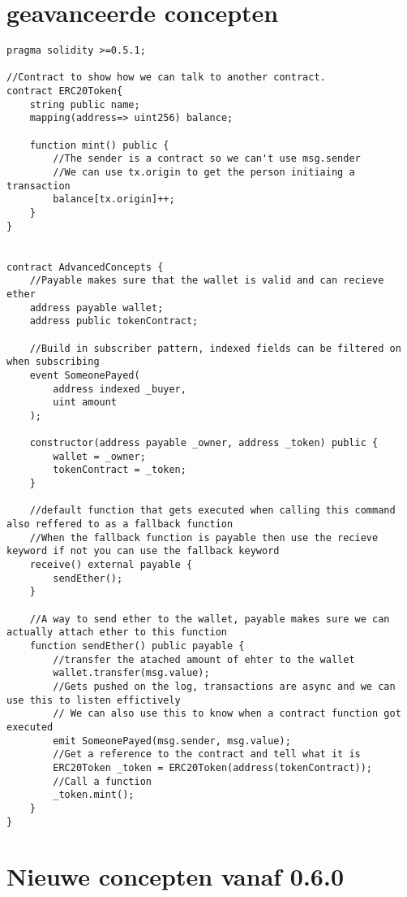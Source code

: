 \section{geavanceerde concepten}
\begin{lstlisting}[language=Solidity]
pragma solidity >=0.5.1;

//Contract to show how we can talk to another contract.
contract ERC20Token{
    string public name;
    mapping(address=> uint256) balance;

    function mint() public {
        //The sender is a contract so we can't use msg.sender
        //We can use tx.origin to get the person initiaing a transaction
        balance[tx.origin]++;
    }
}


contract AdvancedConcepts {
    //Payable makes sure that the wallet is valid and can recieve ether
    address payable wallet;
    address public tokenContract;

    //Build in subscriber pattern, indexed fields can be filtered on when subscribing
    event SomeonePayed(
        address indexed _buyer,
        uint amount
    );

    constructor(address payable _owner, address _token) public {
        wallet = _owner;
        tokenContract = _token;
    }

    //default function that gets executed when calling this command also reffered to as a fallback function
    //When the fallback function is payable then use the recieve keyword if not you can use the fallback keyword
    receive() external payable {
        sendEther();
    }

    //A way to send ether to the wallet, payable makes sure we can actually attach ether to this function
    function sendEther() public payable {
        //transfer the atached amount of ehter to the wallet
        wallet.transfer(msg.value);
        //Gets pushed on the log, transactions are async and we can use this to listen effictively
        // We can also use this to know when a contract function got executed
        emit SomeonePayed(msg.sender, msg.value);
        //Get a reference to the contract and tell what it is
        ERC20Token _token = ERC20Token(address(tokenContract));
        //Call a function
        _token.mint();
    }
}
\end{lstlisting}
\section{Nieuwe concepten vanaf 0.6.0}
